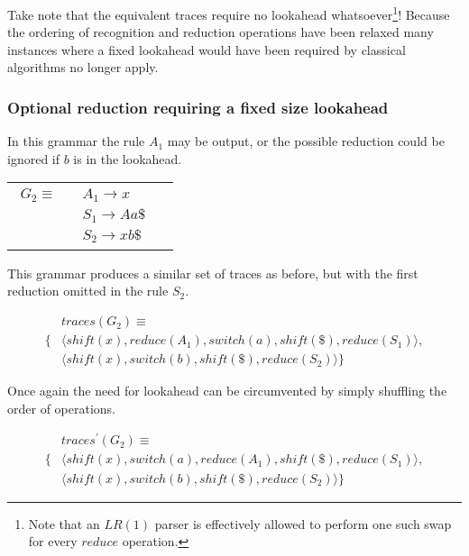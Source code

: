 \documentclass[envcountsame,runningheads]{llncs}
\begin{document}
Take note that the equivalent traces require no lookahead whatsoever\footnote{Note that an $LR(1)$ parser is effectively allowed to perform one such swap for every $reduce$ operation.}!
Because the ordering of recognition and reduction operations have been relaxed many instances where a fixed lookahead would have been required by classical algorithms no longer apply.

\subsubsection{Optional reduction requiring a fixed size lookahead}
In this grammar the rule $A_1$ may be output, or the possible reduction could be ignored if $b$ is in the lookahead.

\begin{tabular}[t]{cl}
\parbox{.3\textwidth}{
\begin{align*}
G_2 \equiv \quad & A_1 \rightarrow x\\
                 & S_1 \rightarrow A a \$\\
                 & S_2 \rightarrow x b \$
\end{align*}}
\parbox{.6\textwidth}{}
\end{tabular}

This grammar produces a similar set of traces as before, but with the first reduction omitted in the rule $S_2$.

{\small\parbox{.3\textwidth}{\begin{align*}
&traces(G_2) \equiv \\
\{ & \langle shift(x), reduce(A_1), switch(a), shift(\$), reduce(S_1) \rangle,\\
   & \langle shift(x), switch(b), shift(\$), reduce(S_2) \rangle \}
\end{align*}}}

Once again the need for lookahead can be circumvented by simply shuffling the order of operations.

{\small\parbox{.3\textwidth}{\begin{align*}
&traces^{\prime}(G_2) \equiv \\
\{ & \langle shift(x), switch(a), reduce(A_1), shift(\$), reduce(S_1) \rangle,\\
   & \langle shift(x), switch(b), shift(\$), reduce(S_2) \rangle \}
\end{align*}}}

\end{document}
